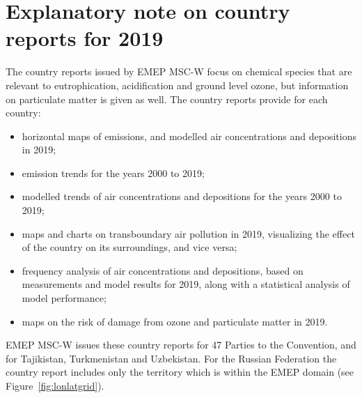 \setcounter{page}{1}

\cleardoublepage
\chapter[2019 Country Reports]{Explanatory note on country reports for 2019}
\label{ch:appx_countryrep_2019}


The country reports issued by EMEP MSC-W \citep{Klein:2021} focus on chemical species that are relevant to eutrophication, acidification and ground level ozone, but information on particulate matter is given as well.
The country reports provide for each country:
\begin{itemize}
\item horizontal maps of emissions, and modelled air concentrations and depositions in 2019;
\item emission trends for the years 2000 to 2019;
\item modelled trends of air concentrations and depositions for the years 2000 to 2019;
\item maps and charts on transboundary air pollution in 2019, visualizing the effect of the country on its surroundings, and vice versa;
\item frequency analysis of air concentrations and depositions, based on measurements and model results for 2019, along with a statistical analysis of model performance;
\item maps on the risk of damage from ozone and particulate matter in 2019.
\end{itemize}

EMEP MSC-W issues these country reports for 47 Parties to the Convention, and for Tajikistan, Turkmenistan and Uzbekistan. For the Russian Federation the country report includes only the territory which is within the EMEP domain (see Figure~\ref{fig:lonlatgrid}).


